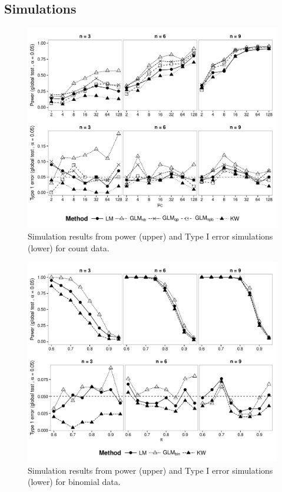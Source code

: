 \documentclass{scrartcl}\usepackage[]{graphicx}\usepackage[]{color}
\begin{document}
\subsection{Simulations}
\begin{figure}
  \includegraphics[width=\linewidth]{p_glob_c.pdf}
  \caption{Simulation results from power (upper) and Type I error simulations (lower) for count data.}
  \label{fig:p_glob_c}
\end{figure}

\begin{figure}
  \includegraphics[width=\linewidth]{p_glob_p.pdf}
  \caption{Simulation results from power (upper) and Type I error simulations (lower) for binomial data.}
\end{figure}
\end{document}
